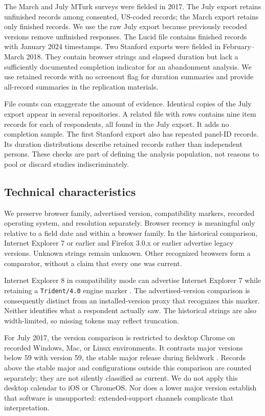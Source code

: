 \documentclass[11pt]{article}
\begin{document}
The March and July MTurk surveys were fielded in 2017. The July export retains \JulyUnfinished{} unfinished records among \JulyAnalysisN{} consented, US-coded records; the March export retains only finished records. We use the raw July export because previously recoded versions remove unfinished responses. The Lucid file contains \LucidAnalysisN{} finished records with January 2024 timestamps. Two Stanford exports were fielded in February--March 2018. They contain browser strings and elapsed duration but lack a sufficiently documented completion indicator for an abandonment analysis. We use retained records with no screenout flag for duration summaries and provide all-record summaries in the replication materials.

File counts can exaggerate the amount of evidence. Identical copies of the July export appear in several repositories. A related file with \LongRows{} rows contains nine item records for each of \LongRespondents{} respondents, all found in the July export. It adds no completion sample. The first Stanford export also has \StanfordRepeated{} repeated panel-ID records. Its duration distributions describe retained records rather than independent persons. These checks are part of defining the analysis population, not reasons to pool or discard studies indiscriminately.

\subsection{Technical characteristics}

We preserve browser family, advertised version, compatibility markers, recorded operating system, and resolution separately. Browser recency is meaningful only relative to a field date and within a browser family. In the historical comparison, Internet Explorer 7 or earlier and Firefox 3.0.x or earlier advertise legacy versions. Unknown strings remain unknown. Other recognized browsers form a comparator, without a claim that every one was current.

Internet Explorer 8 in compatibility mode can advertise Internet Explorer 7 while retaining a \texttt{Trident/4.0} engine marker \citep{microsoft2022}. The advertised-version comparison is consequently distinct from an installed-version proxy that recognizes this marker. Neither identifies what a respondent actually saw. The historical strings are also width-limited, so missing tokens may reflect truncation.

For July 2017, the version comparison is restricted to desktop Chrome on recorded Windows, Mac, or Linux environments. It contrasts major versions below 59 with version 59, the stable major release during fieldwork \citep{chrome2017}. Records above the stable major and configurations outside this comparison are counted separately; they are not silently classified as current. We do not apply this desktop calendar to iOS or ChromeOS. Nor does a lower major version establish that software is unsupported: extended-support channels complicate that interpretation.
\end{document}
